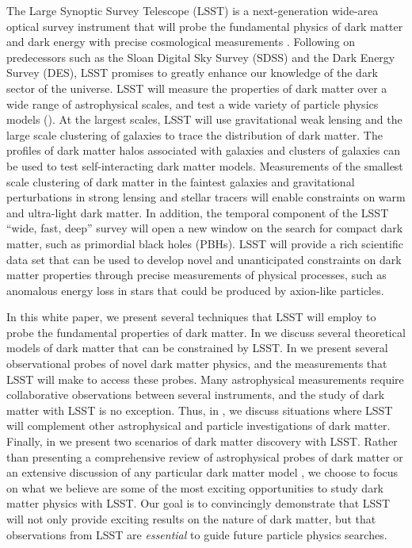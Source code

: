 The Large Synoptic Survey Telescope (LSST) is a next-generation wide-area optical survey instrument that will probe the fundamental physics of dark matter and dark energy with precise cosmological measurements \citep{0805.2366}. 
Following on predecessors such as the Sloan Digital Sky Survey (SDSS) and the Dark Energy Survey (DES), LSST promises to greatly enhance our knowledge of the dark sector of the universe. 
LSST will measure the properties of dark matter over a wide range of astrophysical scales, and test a wide variety of particle physics models ().
At the largest scales, LSST will use gravitational weak lensing and the large scale clustering of galaxies to trace the distribution of dark matter.
The profiles of dark matter halos associated with galaxies and clusters of galaxies can be used to test self-interacting dark matter models.
Measurements of the smallest scale clustering of dark matter in the faintest galaxies and gravitational perturbations in strong lensing and stellar tracers will enable constraints on warm and ultra-light dark matter.
In addition, the temporal component of the LSST ``wide, fast, deep'' survey will open a new window on the search for compact dark matter, such as primordial black holes (PBHs).
LSST will provide a rich scientific data set that can be used to develop novel and unanticipated constraints on dark matter properties through precise measurements of physical processes, such as anomalous energy loss in stars that could be produced by axion-like particles.

In this white paper, we present several techniques that LSST will employ to probe the fundamental properties of dark matter. 
In  we discuss several theoretical models of dark matter that can be constrained by LSST.
In  we present several observational probes of novel dark matter physics, and the  measurements that LSST will make to access these probes.
Many astrophysical measurements require collaborative observations between several instruments, and the study of dark matter with LSST is no exception. 
Thus, in , we discuss situations where LSST will complement other astrophysical and particle investigations of dark matter.
Finally, in  we present two scenarios of dark matter discovery with LSST.
Rather than presenting a comprehensive review of astrophysical probes of dark matter  \citep[e.g.,][]{BuckleyPeter:2017} or an extensive discussion of any particular dark matter model \citep[e.g.,][]{Jain:2019}, we choose to focus on what we believe are some of the most exciting opportunities to study dark matter physics with LSST. 
Our goal is to convincingly demonstrate that LSST will not only provide exciting results on the nature of dark matter, but that observations from LSST are {\it essential} to guide future particle physics searches.

